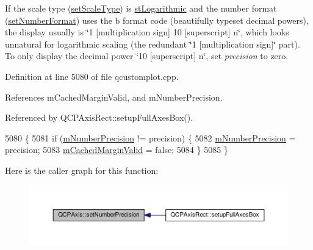 If the scale type (\hyperlink{class_q_c_p_axis_adef29cae617af4f519f6c40d1a866ca6}{set\+Scale\+Type}) is \hyperlink{class_q_c_p_axis_a36d8e8658dbaa179bf2aeb973db2d6f0abf5b785ad976618816dc6f79b73216d4}{st\+Logarithmic} and the number format (\hyperlink{class_q_c_p_axis_ae585a54dc2aac662e90a2ca82f002590}{set\+Number\+Format}) uses the \textquotesingle{}b\textquotesingle{} format code (beautifully typeset decimal powers), the display usually is \char`\"{}1 \mbox{[}multiplication sign\mbox{]} 10 \mbox{[}superscript\mbox{]} n\char`\"{}, which looks unnatural for logarithmic scaling (the redundant \char`\"{}1 \mbox{[}multiplication sign\mbox{]}\char`\"{} part). To only display the decimal power \char`\"{}10
\mbox{[}superscript\mbox{]} n\char`\"{}, set {\itshape precision} to zero. 

Definition at line 5080 of file qcustomplot.\+cpp.



References m\+Cached\+Margin\+Valid, and m\+Number\+Precision.



Referenced by Q\+C\+P\+Axis\+Rect\+::setup\+Full\+Axes\+Box().


\begin{DoxyCode}
5080                                               \{
5081   \textcolor{keywordflow}{if} (\hyperlink{class_q_c_p_axis_acd76e8c783384d99ccc4a13797eec188}{mNumberPrecision} != precision) \{
5082     \hyperlink{class_q_c_p_axis_acd76e8c783384d99ccc4a13797eec188}{mNumberPrecision} = precision;
5083     \hyperlink{class_q_c_p_axis_a2cde37b6e385f47e11322df4ac1b0e9b}{mCachedMarginValid} = \textcolor{keyword}{false};
5084   \}
5085 \}
\end{DoxyCode}


Here is the caller graph for this function\+:\nopagebreak
\begin{figure}[H]
\begin{center}
\leavevmode
\includegraphics[width=350pt]{class_q_c_p_axis_a21dc8023ad7500382ad9574b48137e63_icgraph}
\end{center}
\end{figure}


\hypertarget{class_q_c_p_axis_a04a652603cbe50eba9969ee6d68873c3}{}
